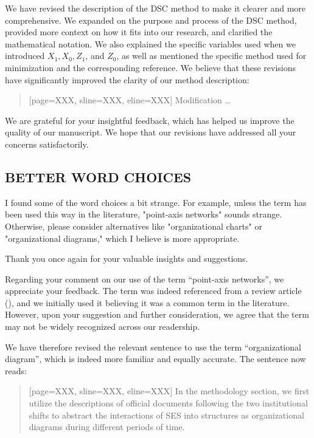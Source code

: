 \AR{} We have revised the description of the DSC method to make it clearer and more comprehensive. We expanded on the purpose and process of the DSC method, provided more context on how it fits into our research, and clarified the mathematical notation. We also explained the specific variables used when we introduced $X_1, X_0, Z_1$, and $Z_0$, as well as mentioned the specific method used for minimization and the corresponding reference. We believe that these revisions have significantly improved the clarity of our method description:

\begin{quote}[page=XXX, sline=XXX, eline=XXX]
    Modification \dots
\end{quote}

\AR*{} We are grateful for your insightful feedback, which has helped us improve the quality of our manuscript. We hope that our revisions have addressed all your concerns satisfactorily.


\subsection{BETTER WORD CHOICES}\label{sec:1-2}

\RC{} I found some of the word choices a bit strange. For example, unless the term has been used this way in the literature, "point-axis networks" sounds strange. Otherwise, please consider alternatives like "organizational charts" or "organizational diagrams," which I believe is more appropriate.

\AR{} Thank you once again for your valuable insights and suggestions.

\AR*{} Regarding your comment on our use of the term ``point-axis networks'', we appreciate your feedback. The term was indeed referenced from a review article (\cite{kluger2020}), and we initially used it believing it was a common term in the literature. However, upon your suggestion and further consideration, we agree that the term may not be widely recognized across our readership.

\AR*{} We have therefore revised the relevant sentence to use the term ``organizational diagram'', which is indeed more familiar and equally accurate. The sentence now reads:

\begin{quote}[page=XXX, sline=XXX, eline=XXX]
    In the methodology section, we first utilize the descriptions of official documents following the two institutional shifts to abstract the interactions of SES into structures as organizational diagrams during different periods of time.
\end{quote}

